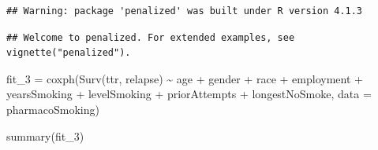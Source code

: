 \documentclass[
]{article}
\newenvironment{Shaded}{\begin{snugshade}}{\end{snugshade}}
\newcommand{\AttributeTok}[1]{\textcolor[rgb]{0.77,0.63,0.00}{#1}}
\newcommand{\FunctionTok}[1]{\textcolor[rgb]{0.00,0.00,0.00}{#1}}
\newcommand{\NormalTok}[1]{#1}
\newcommand{\OtherTok}[1]{\textcolor[rgb]{0.56,0.35,0.01}{#1}}
\newcommand{\SpecialCharTok}[1]{\textcolor[rgb]{0.00,0.00,0.00}{#1}}
\begin{document}
\begin{verbatim}
## Warning: package 'penalized' was built under R version 4.1.3
\end{verbatim}

\begin{verbatim}
## Welcome to penalized. For extended examples, see vignette("penalized").
\end{verbatim}

\begin{Shaded}
\begin{Highlighting}[]
\NormalTok{fit\_3 }\OtherTok{=} \FunctionTok{coxph}\NormalTok{(}\FunctionTok{Surv}\NormalTok{(ttr, relapse) }\SpecialCharTok{\textasciitilde{}}\NormalTok{ age }\SpecialCharTok{+}\NormalTok{ gender }\SpecialCharTok{+}\NormalTok{ race }\SpecialCharTok{+}\NormalTok{ employment }\SpecialCharTok{+}\NormalTok{ yearsSmoking }\SpecialCharTok{+}\NormalTok{ levelSmoking }\SpecialCharTok{+}\NormalTok{ priorAttempts }\SpecialCharTok{+}\NormalTok{ longestNoSmoke, }\AttributeTok{data =}\NormalTok{ pharmacoSmoking)}

\FunctionTok{summary}\NormalTok{(fit\_3)}
\end{Highlighting}
\end{Shaded}
\end{document}
